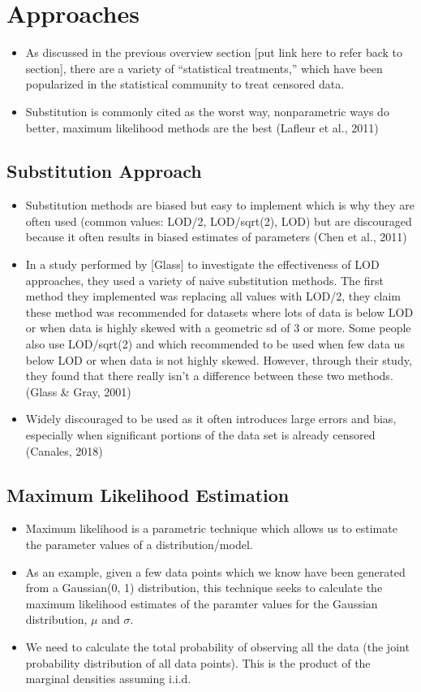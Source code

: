 \documentclass[12pt, twoside]{amherstthesis}
\begin{document}
\hypertarget{Approaches}{%
\section{Approaches}\label{Approaches}}
\begin{itemize}
\item
  As discussed in the previous overview section {[}put link here to refer back to section{]}, there are a variety of ``statistical treatments,'' which have been popularized in the statistical community to treat censored data.
\item
  Substitution is commonly cited as the worst way, nonparametric ways do better, maximum likelihood methods are the best (Lafleur et al., 2011)
\end{itemize}
\hypertarget{Substitution}{%
\subsection{Substitution Approach}\label{Substitution}}
\begin{itemize}
\item
  Substitution methods are biased but easy to implement which is why they are often used (common values: LOD/2, LOD/sqrt(2), LOD) but are discouraged because it often results in biased estimates of parameters (Chen et al., 2011)
\item
  In a study performed by {[}Glass{]} to investigate the effectiveness of LOD approaches, they used a variety of naive substitution methods. The first method they implemented was replacing all values with LOD/2, they claim these method was recommended for datasets where lots of data is below LOD or when data is highly skewed with a geometric sd of 3 or more. Some people also use LOD/sqrt(2) and which recommended to be used when few data us below LOD or when data is not highly skewed. However, through their study, they found that there really isn't a difference between these two methods. (Glass \& Gray, 2001)
\item
  Widely discouraged to be used as it often introduces large errors and bias, especially when significant portions of the data set is already censored (Canales, 2018)
\end{itemize}
\hypertarget{MLE}{%
\subsection{Maximum Likelihood Estimation}\label{MLE}}
\begin{itemize}
\item
  Maximum likelihood is a parametric technique which allows us to estimate the parameter values of a distribution/model.
\item
  As an example, given a few data points which we know have been generated from a Gaussian(0, 1) distribution, this technique seeks to calculate the maximum likelihood estimates of the paramter values for the Gaussian distribution, \(\mu\) and \(\sigma\).
\item
  We need to calculate the total probability of observing all the data (the joint probability distribution of all data points). This is the product of the marginal densities assuming i.i.d.
\end{itemize}
\end{document}
